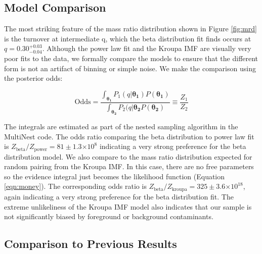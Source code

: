 \documentclass{emulateapj}
\providecommand{\e}[1]{\ensuremath{\times 10^{#1}}}
\renewcommand{\vec}[1]{\bm{#1}}
\begin{document}
\subsection{Model Comparison}

The most striking feature of the mass ratio distribution shown in Figure \ref{fig:mrd} is the turnover at intermediate q, which the beta distribution fit finds occurs at $q = 0.30^{+0.03}_{-0.04}$. Although the power law fit and the Kroupa IMF are visually very poor fits to the data, we formally compare the models to ensure that the different form is not an artifact of binning or simple noise. We make the comparison using the posterior odds:

\begin{equation}
\mathrm{Odds} = \frac{\int_{\vec{\theta_1}} P_1(q|\vec{\theta_1}) P(\vec{\theta_1})}{\int_{\vec{\theta_2}} P_2(q|\vec{\theta_2}  P(\vec{\theta_2})} \equiv \frac{Z_1}{Z_2}
\end{equation}

The integrals are estimated as part of the nested sampling algorithm in the MultiNest code. The odds ratio comparing the beta distribution to power law fit is $Z_\mathrm{beta} / Z_\mathrm{power} = 81 \pm 1.3 \e{8}$ indicating a very strong preference for the beta distribution model. We also compare to the mass ratio distribution expected for random pairing from the Kroupa IMF. In this case, there are no free parameters so the evidence integral just becomes the likelihood function (Equation \ref{eqn:money}). The corresponding odds ratio is  $Z_\mathrm{beta} / Z_\mathrm{kroupa} = 325 \pm 3.6 \e{18}$, again indicating a very strong preference for the beta distribution fit. The extreme unlikeliness of the Kroupa IMF model also indicates that our sample is not significantly biased by foreground or background contaminants.


\subsection{Comparison to Previous Results}
\end{document}
